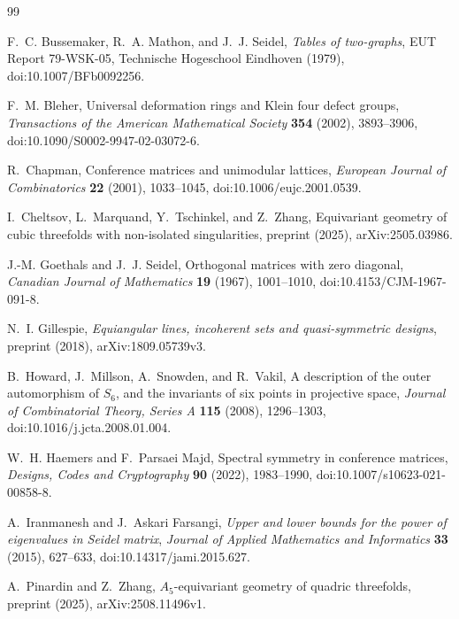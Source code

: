 \documentclass[11pt]{article}
\theoremstyle{definition}
\theoremstyle{remark}
\begin{document}
\begin{thebibliography}{99}

F.~C. Bussemaker, R.~A. Mathon, and J.~J. Seidel,
\newblock \emph{Tables of two-graphs},
\newblock EUT Report 79-WSK-05, Technische Hogeschool Eindhoven (1979),
doi:10.1007/BFb0092256.

F.~M. Bleher,
\newblock Universal deformation rings and Klein four defect groups,
\newblock \emph{Transactions of the American Mathematical Society}
\textbf{354} (2002), 3893--3906,
doi:10.1090/S0002-9947-02-03072-6.

R.~Chapman,
\newblock Conference matrices and unimodular lattices,
\newblock \emph{European Journal of Combinatorics} \textbf{22} (2001),
1033--1045, doi:10.1006/eujc.2001.0539.

I.~Cheltsov, L.~Marquand, Y.~Tschinkel, and Z.~Zhang,
\newblock Equivariant geometry of cubic threefolds with non-isolated
singularities,
\newblock preprint (2025), arXiv:2505.03986.

J.-M. Goethals and J.~J. Seidel,
\newblock Orthogonal matrices with zero diagonal,
\newblock \emph{Canadian Journal of Mathematics} \textbf{19} (1967),
1001--1010, doi:10.4153/CJM-1967-091-8.

N.~I. Gillespie,
\newblock \emph{Equiangular lines, incoherent sets and quasi-symmetric
designs},
\newblock preprint (2018), arXiv:1809.05739v3.

B.~Howard, J.~Millson, A.~Snowden, and R.~Vakil,
\newblock A description of the outer automorphism of \(S_6\), and the
invariants of six points in projective space,
\newblock \emph{Journal of Combinatorial Theory, Series A} \textbf{115}
(2008), 1296--1303, doi:10.1016/j.jcta.2008.01.004.

W.~H. Haemers and F.~Parsaei Majd,
\newblock Spectral symmetry in conference matrices,
\newblock \emph{Designs, Codes and Cryptography} \textbf{90} (2022),
1983--1990, doi:10.1007/s10623-021-00858-8.

A.~Iranmanesh and J.~Askari Farsangi,
\newblock \emph{Upper and lower bounds for the power of eigenvalues in
Seidel matrix},
\newblock \emph{Journal of Applied Mathematics and Informatics} \textbf{33}
(2015), 627--633, doi:10.14317/jami.2015.627.

A.~Pinardin and Z.~Zhang,
\newblock \(A_5\)-equivariant geometry of quadric threefolds,
\newblock preprint (2025), arXiv:2508.11496v1.


\end{thebibliography}
\end{document}
